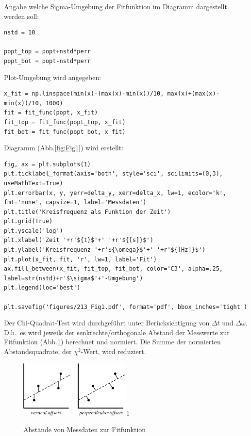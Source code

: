 \documentclass[a4paper,10pt]{article}
\begin{document}
Angabe welche Sigma-Umgebung der Fitfunktion im Diagramm dargestellt werden soll:\begin{lstlisting}
nstd = 10

popt_top = popt+nstd*perr
popt_bot = popt-nstd*perr

\end{lstlisting}

Plot-Umgebung wird angegeben:\begin{lstlisting}
x_fit = np.linspace(min(x)-(max(x)-min(x))/10, max(x)+(max(x)-min(x))/10, 1000)
fit = fit_func(popt, x_fit)
fit_top = fit_func(popt_top, x_fit)
fit_bot = fit_func(popt_bot, x_fit)

\end{lstlisting}

Diagramm (Abb.\ref{fig:Fig1}) wird erstellt:\begin{lstlisting}
fig, ax = plt.subplots(1)
plt.ticklabel_format(axis='both', style='sci', scilimits=(0,3), useMathText=True)
plt.errorbar(x, y, yerr=delta_y, xerr=delta_x, lw=1, ecolor='k', fmt='none', capsize=1, label='Messdaten')
plt.title('Kreisfrequenz als Funktion der Zeit')
plt.grid(True)
plt.yscale('log')
plt.xlabel('Zeit '+r'${t}$'+' '+r'${[s]}$')
plt.ylabel('Kreisfrequenz '+r'${\omega}$'+' '+r'${[Hz]}$')
plt.plot(x_fit, fit, 'r', lw=1, label='Fit')
ax.fill_between(x_fit, fit_top, fit_bot, color='C3', alpha=.25, label=str(nstd)+r'$\sigma$'+'-Umgebung')
plt.legend(loc='best')

plt.savefig('figures/213_Fig1.pdf', format='pdf', bbox_inches='tight')

\end{lstlisting}

Der Chi-Quadrat-Test wird durchgeführt unter Berücksichtigung von \( \Delta t\) und \(\Delta \omega\). D.h.~es wird jeweils der senkrechte/orthogonale Abstand der Messwerte zur Fitfunktion (Abb.\ref{fig:chi}) berechnet und normiert\fnrefa.
 Die Summe der normierten Abstandsquadrate, der \unboldmath\( \chi^{2}\)-Wert, wird  reduziert.\boldmath

\begin{figure}[htb]
  \centering
  \begin{annotate}{\includegraphics[width=0.5\textwidth]{chi.png}}{1}
  \end{annotate}
\caption[Abstände von Messdaten zur Fitfunktion]{Abstände von Messdaten zur Fitfunktion\footnotemark}
\label{fig:chi}
\end{figure}
\end{document}
